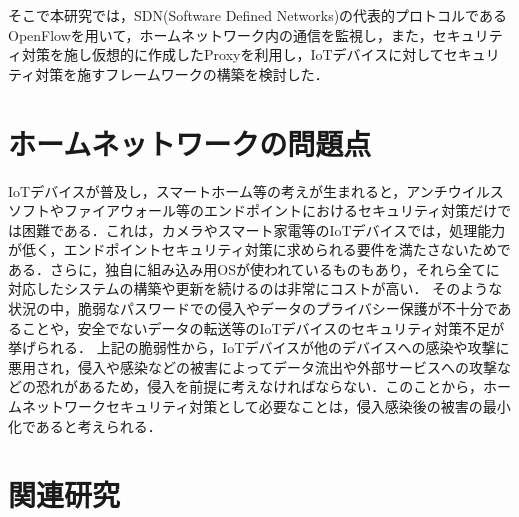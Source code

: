 \documentclass[Japanese]{dicomopapers}
\begin{document}
そこで本研究では，SDN(Software Defined Networks)の代表的プロトコルであるOpenFlow\cite{openflow}を用いて，ホームネットワーク内の通信を監視し，また，セキュリティ対策を施し仮想的に作成したProxyを利用し，IoTデバイスに対してセキュリティ対策を施すフレームワークの構築を検討した．

\section{ホームネットワークの問題点}
IoTデバイスが普及し，スマートホーム等の考えが生まれると，アンチウイルスソフトやファイアウォール等のエンドポイントにおけるセキュリティ対策だけでは困難である．これは，カメラやスマート家電等のIoTデバイスでは，処理能力が低く，エンドポイントセキュリティ対策に求められる要件を満たさないためである\cite{camera}．さらに，独自に組み込み用OSが使われているものもあり，それら全てに対応したシステムの構築や更新を続けるのは非常にコストが高い．
そのような状況の中，脆弱なパスワードでの侵入やデータのプライバシー保護が不十分であることや，安全でないデータの転送等のIoTデバイスのセキュリティ対策不足が挙げられる\cite{owasp}．
上記の脆弱性から，IoTデバイスが他のデバイスへの感染や攻撃に悪用され，侵入や感染などの被害によってデータ流出や外部サービスへの攻撃などの恐れがあるため，侵入を前提に考えなければならない．このことから，ホームネットワークセキュリティ対策として必要なことは，侵入感染後の被害の最小化であると考えられる．

\section{関連研究}
\end{document}
